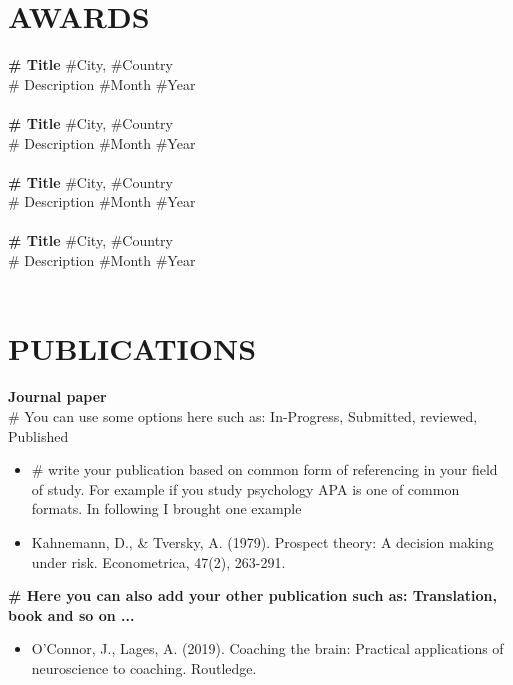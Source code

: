 \section*{AWARDS}
\textbf{\# Title}  \hfill \#City, \#Country\\ 
\# Description \hfill \#Month \#Year\\ \\
\textbf{\# Title}  \hfill \#City, \#Country\\ 
\# Description \hfill \#Month \#Year\\ \\
\textbf{\# Title}  \hfill \#City, \#Country\\ 
\# Description \hfill \#Month \#Year\\ \\
\textbf{\# Title}  \hfill \#City, \#Country\\
\# Description \hfill \#Month \#Year\\ \\

\section*{PUBLICATIONS}
\noindent
\textbf{Journal paper}\\
\textup{\# You can use some options here such as: In-Progress, Submitted, reviewed, Published}%
\begin{itemize}
    \item \# write your publication based on common form of referencing in your field of study. For example if you study psychology APA is one of common formats. In following I brought one example
    \item Kahnemann, D., \& Tversky, A. (1979). Prospect theory: A decision making under risk. Econometrica, 47(2), 263-291.
\end{itemize}
\noindent
\textbf{\# Here you can also add your other publication such as: Translation, book and so on ...}
\begin{itemize}
    \item O'Connor, J., Lages, A. (2019). Coaching the brain: Practical applications of neuroscience to coaching. Routledge.
\end{itemize}

